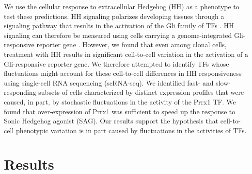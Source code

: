 We use the cellular response to extracellular Hedgehog (HH) as a phenotype to test these predictions. HH signaling polarizes developing tissues through a signaling pathway that results in the activation of the Gli family of TFs \cite{Kong2019-wo,Briscoe2013-ze,Lee2016-bf}. HH signaling can therefore be measured using cells carrying a genome-integrated Gli-responsive reporter gene \cite{Pusapati2018-gs}. However, we found that even among clonal cells, treatment with HH results in significant cell-to-cell variation in the activation of a Gli-responsive reporter gene. We therefore attempted to identify TFs whose fluctuations might account for these cell-to-cell differences in HH responsiveness using single-cell RNA sequencing (scRNA-seq). We identified fast- and slow-responding subsets of cells characterized by distinct expression profiles that were caused, in part, by stochastic fluctuations in the activity of the Prrx1 TF.  We found that over-expression of Prrx1 was sufficient to speed up the response to Sonic Hedgehog agonist (SAG). Our results support the hypothesis that cell-to-cell phenotypic variation is in part caused by fluctuations in the activities of TFs.

\section{Results}

